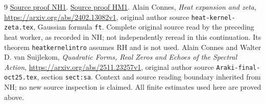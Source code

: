 \documentclass[11pt]{article}
\begin{document}
\begin{thebibliography}{9}
\href{https://github.com/KokunoYumeto/zeta-function-research-reader/blob/5992ad50c0f2a06921f1fcaded7b4e38097c0739/workbenches/splitzero-tandem/continuations/20260920-original-kernel-mixed-determinants/providers/NATIVE_HEAT_ACTION.tex\#L41}{Source proof NH1}. \href{https://github.com/KokunoYumeto/zeta-function-research-reader/blob/5992ad50c0f2a06921f1fcaded7b4e38097c0739/workbenches/splitzero-tandem/continuations/20260920-original-kernel-mixed-determinants/providers/HEAT_METRIC_COMPARISON.tex\#L43}{Source proof HM1}.
 Alain Connes, \emph{Heat expansion and zeta},
\url{https://arxiv.org/abs/2402.13082v1}, original author source
\texttt{heat-kernel-zeta.tex}, Gaussian formula \texttt{ft}.
Complete original source read by the preceding heat worker, as recorded
in NH; not independently reread in this continuation. Its theorem
\texttt{heatkernelintro} assumes RH and is not used.
 Alain Connes and Walter D. van Suijlekom,
\emph{Quadratic Forms, Real Zeros and Echoes of the Spectral Action},
\url{https://arxiv.org/abs/2511.23257v1}, original author source
\texttt{Araki-final-oct25.tex}, section \texttt{sect:sa}.
Context and source reading boundary inherited from NH; no new source
inspection is claimed. All finite estimates used here are proved above.
\end{thebibliography}
\end{document}
